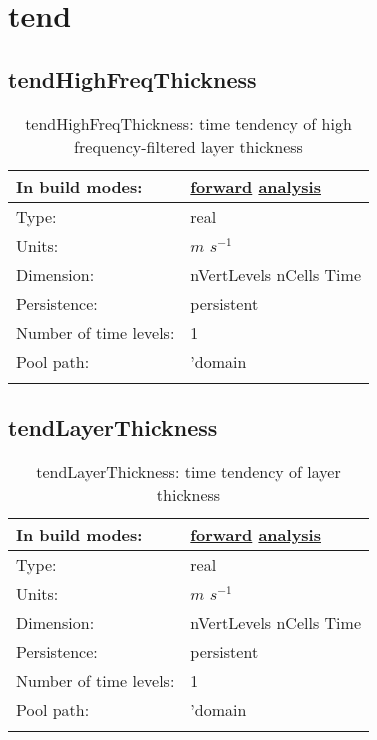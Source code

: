 \section[tend]{tend}
\label{sec:var_sec_tend}
\subsection[tendHighFreqThickness]{tendHighFreqThickness}
\label{subsec:var_sec_tend_tendHighFreqThickness}
\begin{center}
\begin{longtable}{| p{2.0in} | p{4.0in} |}
        \hline 
        In build modes: & \hyperref[subsec:forward_var_tab_tend]{forward} \hyperref[subsec:analysis_var_tab_tend]{analysis} \\
        \hline 
        Type: & real \\
        \hline 
        Units: & $m$ $s^{-1}$ \\
        \hline 
        Dimension: & nVertLevels nCells Time \\
        \hline 
        Persistence: & persistent \\
        \hline 
        Number of time levels: & 1 \\
        \hline 
            Pool path: & 'domain %
 \\
		 \hline 
    \caption{tendHighFreqThickness: time tendency of high frequency-filtered layer thickness}
\end{longtable}
\end{center}
\subsection[tendLayerThickness]{tendLayerThickness}
\label{subsec:var_sec_tend_tendLayerThickness}
\begin{center}
\begin{longtable}{| p{2.0in} | p{4.0in} |}
        \hline 
        In build modes: & \hyperref[subsec:forward_var_tab_tend]{forward} \hyperref[subsec:analysis_var_tab_tend]{analysis} \\
        \hline 
        Type: & real \\
        \hline 
        Units: & $m$ $s^{-1}$ \\
        \hline 
        Dimension: & nVertLevels nCells Time \\
        \hline 
        Persistence: & persistent \\
        \hline 
        Number of time levels: & 1 \\
        \hline 
            Pool path: & 'domain %
 \\
		 \hline 
    \caption{tendLayerThickness: time tendency of layer thickness}
\end{longtable}
\end{center}
